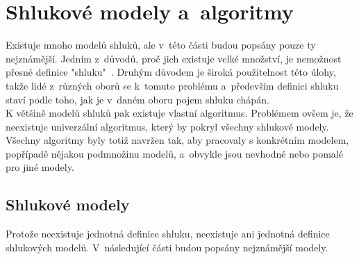 
\section{Shlukové modely a~algoritmy} \label{sec:clustermodels}
Existuje mnoho modelů shluků, ale v~této části budou popsány pouze ty nejznámější. Jedním z~důvodů, proč jich existuje velké množství, je nemožnost přesné definice "shluku"~\cite{EstivillCastro02}. Druhým důvodem je široká použitelnost této úlohy, takže lidé z~různých oborů se k~tomuto problému a~především definici shluku staví podle toho, jak je v~daném oboru pojem shluku chápán.\\

K většině modelů shluků pak existuje vlastní algoritmus. Problémem ovšem je, že neexistuje univerzální algoritmus, který by pokryl všechny shlukové modely. Všechny algoritmy byly totiž navržen tak, aby pracovaly s konkrétním modelem, popřípadě nějakou podmnožinu modelů, a~obvykle jsou nevhodné nebo pomalé pro jiné modely.

\subsection{Shlukové modely}
Protože neexistuje jednotná definice shluku, neexistuje ani jednotná definice shlu\-ko\-vý\-ch modelů. V~následující části budou popsány nejznámější modely.

